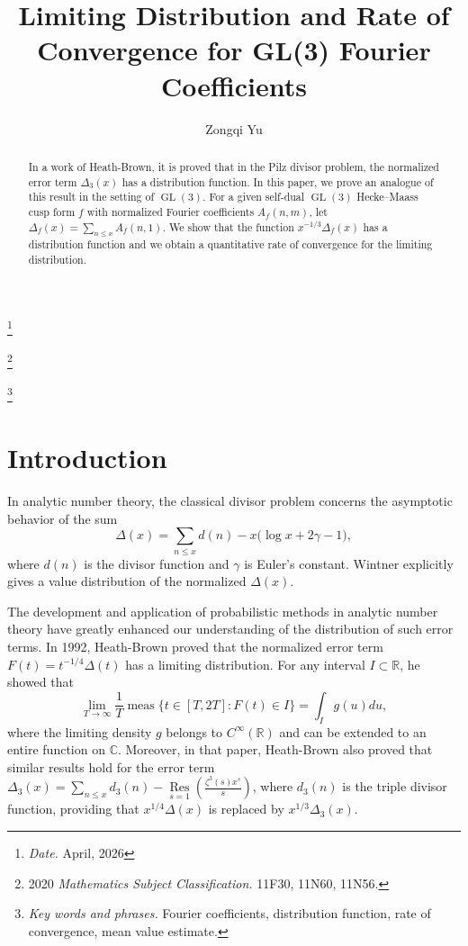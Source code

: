 \documentclass[10pt,leqno]{amsart}
\numberwithin{equation}{section}
\begin{document}
\title{Limiting Distribution and Rate of Convergence for  GL(3) Fourier Coefficients}
\author{Zongqi Yu}
\address{Data Science Institute, Shandong University, Jinan 250100, China}

\let\thefootnote\relax

\footnote{\textit{Date.} April, 2026}

\footnote{2020 \textit{Mathematics Subject Classification.} 11F30, 11N60, 11N56.}

\footnote{\textit{Key words and  phrases.} Fourier coefficients, distribution function, rate of convergence, mean value estimate.}

\begin{abstract}
    In a work of Heath-Brown, it is proved that in the Pilz divisor problem, the normalized error term $\Delta_3(x)$ has a distribution function. In this paper, we prove an analogue of this result in the setting of $\operatorname{GL}(3)$. For a given self-dual $\operatorname{GL}(3)$ Hecke--Maass cusp form $f$ with normalized Fourier coefficients $A_f(n,m)$, let $\Delta_f(x)=\sum_{n\leqslant x}A_f(n,1)$. We show that the function $x^{-1/3}\Delta_f(x)$ has a distribution function and we obtain a quantitative rate of convergence for the limiting distribution.
\end{abstract}
\maketitle

\section{Introduction}
In analytic number theory, the classical divisor problem concerns the asymptotic behavior of the sum
\[
\Delta(x) = \sum_{n \leqslant x} d(n) - x\bigl(\log x + 2\gamma - 1\bigr),
\]
where $d(n)$ is the divisor function and $\gamma$ is Euler's constant. Wintner \cite{MR3645} explicitly gives a value distribution of the normalized $\Delta(x)$. 

The development and application of probabilistic methods in analytic number theory have greatly enhanced our understanding of the distribution of such error terms. In 1992, Heath-Brown \cite{MR1159354} proved that  the normalized error term $F(t)= t^{-1/4}\Delta(t)$ has a limiting distribution. For any interval $I \subset \mathbb{R}$, he showed that
\begin{equation}\label{eq1.1}
\lim_{T \to \infty} \frac{1}{T} \operatorname{meas} \bigl\{ t \in [T, 2T] : F(t) \in I \bigr\} = \int_I g(u) du,
\end{equation}
where the limiting density $g$ belongs to $C^{\infty}(\mathbb{R})$ and can be extended to an entire function on $\mathbb{C}$. Moreover, in that paper, Heath-Brown also proved that similar results hold for the error term $\Delta_3(x)=\sum_{n\leq x}d_3(n)-\underset{s=1}{\operatorname*{\operatorname*{Res}}}\left(\frac{\zeta^3(s)x^s}{s}\right)$, where $d_3(n)$ is the triple divisor function, providing that $x^{1/4}\Delta(x)$ is replaced by $x^{1/3}\Delta_3(x)$.
\end{document}
